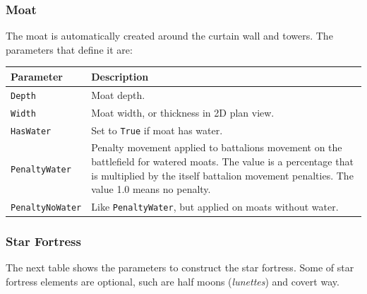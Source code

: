 \documentclass[tog]{acmsiggraph}
\begin{document}
\subsubsection{Moat}
\label{sec:settingscastlemoat}

The moat is automatically created around the curtain wall and towers.
The parameters that define it are: 

\begin{tabularx}{0.48\textwidth}{ |l|X| }
\hline 
\textbf{Parameter} & \textbf{Description} \\[0.15cm]
 \hline
 \texttt{Depth} & Moat depth. \\
 \hline
 \texttt{Width} & Moat width, or thickness in 2D plan view. \\
 \hline
 \texttt{HasWater} & Set to \texttt{True} if moat has water. \\
 \hline
 \texttt{PenaltyWater} & Penalty movement applied to battalions movement on the battlefield for watered moats. The value is a percentage that is multiplied by the itself battalion movement penalties. The value 1.0 means no penalty. \\
 \hline
 \texttt{PenaltyNoWater} & Like \texttt{PenaltyWater}, but applied on moats without water. \\
 \hline
\end{tabularx} 





\subsubsection{Star Fortress}
\label{sec:settingscastlestarfortress}

The next table shows the parameters to construct the star fortress. 
Some of star fortress elements are optional, such are half moons (\textit{lunettes}) and covert way.
\end{document}
